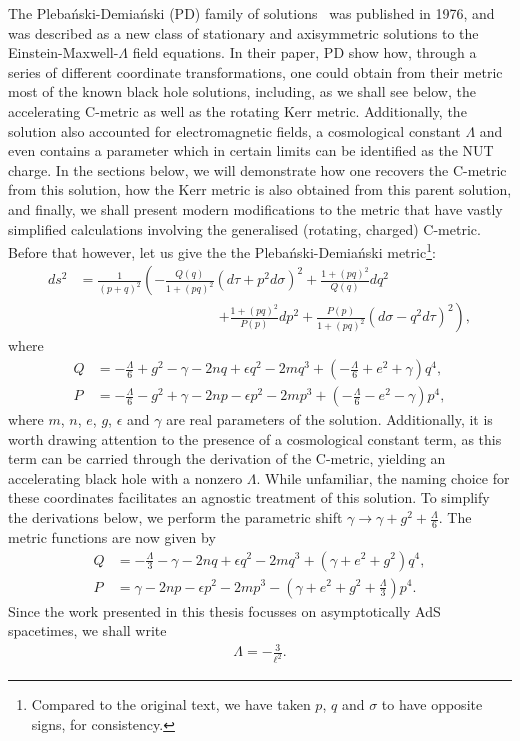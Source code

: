 \documentclass[
twoside,
openright,
frontopenright,
]{dmathesis}
\newcommand{\nn}{\nonumber}
\begin{document}
The Pleba\'nski-Demia\'nski (PD) family of solutions~\cite{Plebanski:1976gy} was
published in 1976, and was described as a new class of stationary and
axisymmetric solutions to the Einstein-Maxwell-$\Lambda$ field equations. In
their paper, PD show how, through a series of different coordinate
transformations, one could obtain from their metric most of the known black hole
solutions, including, as we shall see below, the accelerating C-metric as well
as the rotating Kerr metric. Additionally, the solution also accounted for
electromagnetic fields, a cosmological constant $\Lambda$ and even contains a
parameter which in certain limits can be identified as the NUT charge. In the
sections below, we will demonstrate how one recovers the C-metric from this
solution, how the Kerr metric is also obtained from this parent solution, and
finally, we shall present modern modifications to the metric that have vastly
simplified calculations involving the generalised (rotating, charged)
C-metric. Before that however, let us give the the Pleba\'nski-Demia\'nski
metric\footnote{Compared to the original text, we have taken $p$, $q$ and
  $\sigma$ to have opposite signs, for consistency.}:
\begin{align}
  \label{eq:PD}
  ds^2 &= \frac{1}{(p + q)^2} \left( - \frac{Q(q)}{1+(pq)^2}(d\tau + p^2
         d\sigma)^2 + \frac{1+(pq)^2}{Q(q)}dq^2 \right.\nn\\
  &\hspace{10em}\left.+ \frac{1+(pq)^2}{P(p)}dp^2 +
         \frac{P(p)}{1+(pq)^2}(d\sigma - q^2 d\tau)^2 \right), 
\end{align}
where
\begin{align}
  Q &= -\frac{\Lambda}{6} + g^2 - \gamma - 2nq + \epsilon q^2 -
      2mq^3 + \left(-\frac{\Lambda}{6}+e^2+\gamma\right)q^4,\nn\\
  P &= -\frac{\Lambda}{6} - g^2 + \gamma - 2np - \epsilon p^2 -
      2mp^3 + \left(-\frac{\Lambda}{6}-e^2-\gamma\right)p^4,
\end{align}
where $m$, $n$, $e$, $g$, $\epsilon$ and $\gamma$ are real parameters of the
solution. Additionally, it is worth drawing attention to the presence of a
cosmological constant term, as this term can be carried through the derivation of
the C-metric, yielding an accelerating black hole with a nonzero
$\Lambda$. While unfamiliar, the naming choice for these coordinates facilitates
an agnostic treatment of this solution. To simplify the derivations below, we
perform the parametric shift $\gamma\to \gamma + g^2 +\frac{\Lambda}{6}$. The
metric functions are now given by
\begin{align}
  \label{eq:PDfn}
  Q &= -\frac{\Lambda}{3} - \gamma - 2nq + \epsilon q^2 -
      2mq^3 + \left(\gamma + e^2 + g^2\right)q^4,\nn\\
  P &=  \gamma - 2np - \epsilon p^2 -
      2mp^3 - \left(\gamma+e^2+g^2+\frac{\Lambda}{3}\right)p^4.
\end{align}
Since the work presented in this thesis focusses on asymptotically AdS
spacetimes, we shall write
\begin{align*}
  \Lambda=-\frac{3}{\ell^2}.
\end{align*}
\end{document}
